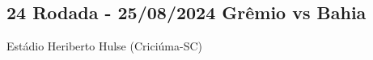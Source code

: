 \newpage
\subsection{24 Rodada - 25/08/2024 Grêmio vs Bahia}

\begin{figure}[H]
    \centering
    
\end{figure}

Estádio Heriberto Hulse (Criciúma-SC)